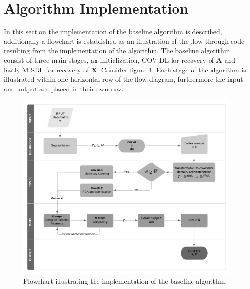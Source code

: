 \section{Algorithm Implementation}
In this section the implementation of the baseline algorithm is described, additionally a flowchart is established as an illustration of the flow through code resulting from the implementation of the algorithm. 
The baseline algorithm consist of three main stages, an initialization, COV-DL for recovery of $\textbf{A}$ and lastly M-SBL for recovery of $\textbf{X}$. 
Consider figure \ref{fig:flow}. 
Each stage of the algorithm is illustrated within one horizontal row of the flow diagram, furthermore the input and output are placed in their own row.    

\begin{figure}[H]
\centering
\includegraphics[scale=0.8]{figures/ch_6/baseline_flowchart.png}
\caption{Flowchart illustrating the implementation of the baseline algorithm.}
\label{fig:flow}
\end{figure}
\noindent
{}

